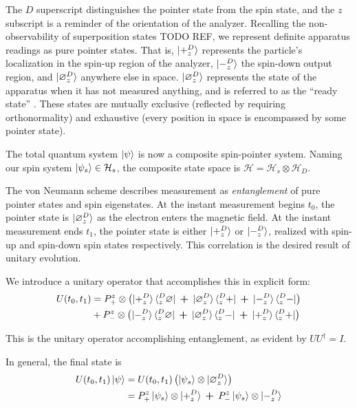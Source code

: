The $D$ superscript distinguishes the pointer state from the spin state, and the $z$ subscript is a reminder of the orientation of the analyzer. Recalling the non-observability of superposition states TODO REF, we represent definite apparatus readings as pure pointer states. That is, $\ket{+^D_z}$ represents the particle's localization in the spin-up region of the analyzer, $\ket{-^D_z}$ the spin-down output region, and $\ket{\varnothing^D_z}$ anywhere else in space. $\ket{\varnothing^D_z}$ represents the state of the apparatus when it has not measured anything, and is referred to as the ``ready state'' \cite{Schlosshauer}. These states are mutually exclusive (reflected by requiring orthonormality) and exhaustive (every position in space is encompassed by some pointer state).

The total quantum system $\ket{\psi}$ is now a composite spin-pointer system. Naming our spin system $\ket{\psi_s} \in \mathcal{H}_s$, the composite state space is $\mathcal{H} = \mathcal{H}_s \otimes \mathcal{H}_D$.

The von Neumann scheme describes measurement as \textit{entanglement} of pure pointer states and spin eigenstates. At the instant measurement begins $t_0$, the pointer state is $\ket{\varnothing^D_z}$ as the electron enters the magnetic field. At the instant measurement ends $t_1$, the pointer state is either $\ket{+^D_z}$ or $\ket{-^D_z}$, realized with spin-up and spin-down spin states respectively. This correlation is the desired result of unitary evolution.

We introduce a unitary operator that accomplishes this in explicit form:
\begin{align}
  U(t_0, t_1) &= P^z_+ \otimes \left(\ket{+^D_z}\bra{^D_z\varnothing} \: \bm{+} \: \ket{\varnothing^D_z}\bra{^D_z+} \: \bm{+} \: \ket{-^D_z}\bra{^D_z-} \right) \\ \nonumber
  &+ P^z_- \otimes \left(\ket{-^D_z}\bra{^D_z\varnothing} \: \bm{+} \: \ket{\varnothing^D_z}\bra{^D_z-} \: \bm{+} \: \ket{+^D_z}\bra{^D_z+} \right)
\end{align}

This is the unitary operator accomplishing entanglement, as evident by $UU^\dagger = I$.

In general, the final state is
\begin{align}
  U(t_0, t_1)\ket{\psi} & =  U(t_0, t_1) \left(\ket{\psi_s} \otimes \ket{\varnothing ^D_z} \right) \\
  &= \nonumber P^z_+ \ket{\psi_s} \otimes \ket{+^D_z} \: \bm{+} \: P^z_- \ket{\psi_s} \otimes \ket{-^D_z}
\end{align}

